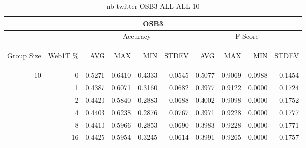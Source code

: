 \begin{center}
\begin{table}[htbp]
\begin{tabular}{ | r | r | r | r | r | r | r | r | r | r |}
\hline
\multicolumn{10}{|c|}{OSB3}\\
\hline
 & & \multicolumn{4}{|c|}{Accuracy} & \multicolumn{4}{|c|}{F-Score}\\ \cline{3-10}
\begin{sideways}Group Size\end{sideways} & \begin{sideways}Web1T \%\end{sideways} & \begin{sideways}AVG\end{sideways} & \begin{sideways}MAX\end{sideways} & \begin{sideways}MIN\end{sideways} & \begin{sideways}STDEV\end{sideways} & \begin{sideways}AVG\end{sideways} & \begin{sideways}MAX\end{sideways} & \begin{sideways}MIN\end{sideways} & \begin{sideways}STDEV\end{sideways}\\
\hline
\multirow{5}{*}{10}
 & 0 & 0.5271 & 0.6410 & 0.4333 & 0.0545 & 0.5077 & 0.9069 & 0.0988 & 0.1454\\ \cline{2-10}
 & 1 & 0.4387 & 0.6071 & 0.3160 & 0.0682 & 0.3977 & 0.9122 & 0.0000 & 0.1724\\ \cline{2-10}
 & 2 & 0.4420 & 0.5840 & 0.2883 & 0.0688 & 0.4002 & 0.9098 & 0.0000 & 0.1752\\ \cline{2-10}
 & 4 & 0.4403 & 0.6238 & 0.2876 & 0.0767 & 0.3971 & 0.9228 & 0.0000 & 0.1777\\ \cline{2-10}
 & 8 & 0.4410 & 0.5966 & 0.2853 & 0.0690 & 0.3983 & 0.9228 & 0.0000 & 0.1771\\ \cline{2-10}
 & 16 & 0.4425 & 0.5954 & 0.3245 & 0.0614 & 0.3991 & 0.9265 & 0.0000 & 0.1757\\ \cline{2-10}
\hline
\end{tabular}
\caption{nb-twitter-OSB3-ALL-ALL-10}
\label{table:nb-twitter-OSB3-ALL-ALL-10}
\end{table}
\end{center}


